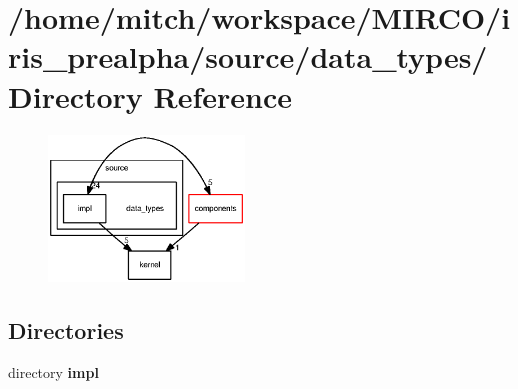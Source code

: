 \section{/home/mitch/workspace/MIRCO/iris\_\-prealpha/source/data\_\-types/ Directory Reference}
\label{dir_7d1f91938b47918a06a4d668a05f5b33}


\nopagebreak
\begin{figure}[H]
\begin{center}
\leavevmode
\includegraphics[width=148pt]{dir_7d1f91938b47918a06a4d668a05f5b33_dep}
\end{center}
\end{figure}
\subsection*{Directories}
\begin{CompactItemize}
\item 
directory {\bf impl}
\end{CompactItemize}
